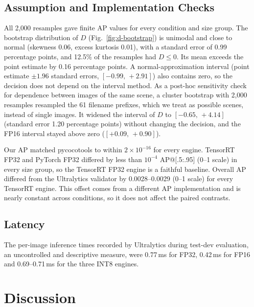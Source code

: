 \documentclass[conference]{IEEEtran}
\begin{document}
\subsection{Assumption and Implementation Checks}
All 2,000 resamples gave finite AP values for
every condition and size group. The bootstrap
distribution of $D$ (Fig.~\ref{fig:d-bootstrap}) is unimodal and close to normal (skewness 0.06,
excess kurtosis 0.01), with a standard error of 0.99 percentage points, and 12.5\% of the
resamples had $D\le0$. Its mean exceeds the point estimate by 0.16 percentage points. A
normal-approximation interval (point estimate $\pm1.96$ standard errors,
$[-0.99,\,+2.91]$) also contains zero, so the decision does not depend on the interval method. As
a post-hoc sensitivity check for dependence between images of the same scene, a cluster bootstrap
with 2,000 resamples resampled the 61 filename prefixes, which we treat as possible scenes,
instead of single images. It widened the interval of $D$ to
$[-0.65,\,+4.14]$ (standard error 1.20 percentage points) without changing the decision, and the
FP16 interval stayed above zero ($[+0.09,\,+0.90]$).

Our AP matched pycocotools to within $2\times10^{-16}$ for every
engine. TensorRT FP32 and PyTorch FP32 differed by less than $10^{-4}$ AP@[.5:.95] (0--1 scale) in every
size group, so the TensorRT FP32 engine is a faithful baseline. Overall AP differed from the
Ultralytics validator by 0.0028--0.0029 (0--1 scale) for every TensorRT engine. This offset comes from a
different AP implementation and is nearly constant across conditions, so it does not affect the
paired contrasts.

\subsection{Latency}
The per-image inference times recorded by Ultralytics during test-dev evaluation, an
uncontrolled and descriptive measure, were 0.77\,ms for FP32, 0.42\,ms for FP16 and
0.69--0.71\,ms for the three INT8 engines.

\section{Discussion}
\label{sec:discussion}
\end{document}
